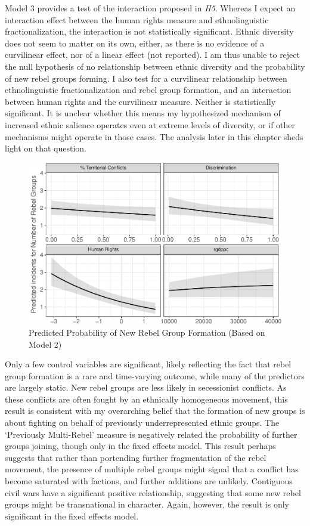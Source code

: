 \documentclass[12pt,]{book}
\theoremstyle{definition}
\theoremstyle{definition}
\theoremstyle{definition}
\theoremstyle{remark}
\begin{document}
Model 3 provides a test of the interaction proposed in \emph{H5}.
Whereas I expect an interaction effect between the human rights measure
and ethnolinguistic fractionalization, the interaction is not
statistically significant. Ethnic diversity does not seem to matter on
its own, either, as there is no evidence of a curvilinear effect, nor of
a linear effect (not reported). I am thus unable to reject the null
hypothesis of no relationship between ethnic diversity and the
probability of new rebel groups forming. I also test for a curvilinear
relationship between ethnolinguistic fractionalization and rebel group
formation, and an interaction between human rights and the curvilinear
measure. Neither is statistically significant. It is unclear whether
this means my hypothesized mechanism of increased ethnic salience
operates even at extreme levels of diversity, or if other mechanisms
might operate in those cases. The analysis later in this chapter sheds
light on that question.

\begin{figure}
\centering
\includegraphics{dissertation_files/figure-latex/effectplot-1.pdf}
\caption{\label{fig:effectplot}Predicted Probability of New Rebel Group
Formation (Based on Model 2)}
\end{figure}

Only a few control variables are significant, likely reflecting the fact
that rebel group formation is a rare and time-varying outcome, while
many of the predictors are largely static. New rebel groups are less
likely in secessionist conflicts. As these conflicts are often fought by
an ethnically homogeneous movement, this result is consistent with my
overarching belief that the formation of new groups is about fighting on
behalf of previously underrepresented ethnic groups. The `Previously
Multi-Rebel' measure is negatively related the probability of further
groups joining, though only in the fixed effects model. This result
perhaps suggests that rather than portending further fragmentation of
the rebel movement, the presence of multiple rebel groups might signal
that a conflict has become saturated with factions, and further
additions are unlikely. Contiguous civil wars have a significant
positive relationship, suggesting that some new rebel groups might be
transnational in character. Again, however, the result is only
significant in the fixed effects model.
\end{document}
